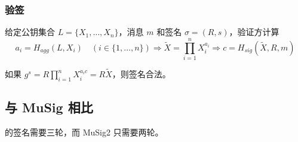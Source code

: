 \documentclass[a4paper,10pt]{article}
\begin{document}
\subsubsection{验签}
给定公钥集合 \(L=\{X_1,\dots,X_n\}\)，消息 \(m\) 和签名 \(\sigma=(R,s)\)，验证方计算
\[
  a_i=H_{agg}(L,X_i) \quad (i\in\{1,\dots,n\}) \Rightarrow \tilde{X}=\prod_{i=1}^n X_i^{a_i} \Rightarrow c=H_{sig}(\tilde{X},R,m)
\]
 
如果 \(g^s=R\prod_{i=1}^n X_i^{a_i c}=R\tilde{X}\)，则签名合法。

\subsection{与 MuSig 相比}
\cite{cryptoeprint:2018:068} 的签名需要三轮，而 MuSig2 只需要两轮。



\end{document}
